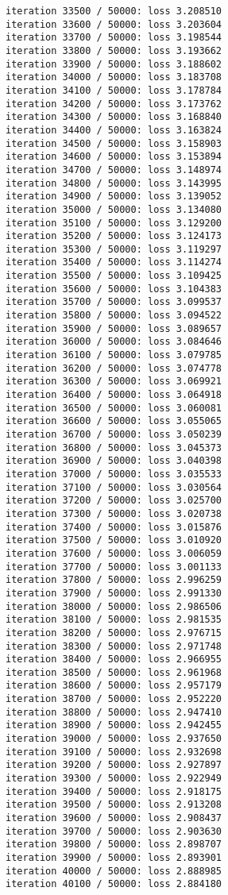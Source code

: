 \documentclass[11pt]{article}
\begin{document}
\begin{Verbatim}[commandchars=\\\{\}]
iteration 33500 / 50000: loss 3.208510
iteration 33600 / 50000: loss 3.203604
iteration 33700 / 50000: loss 3.198544
iteration 33800 / 50000: loss 3.193662
iteration 33900 / 50000: loss 3.188602
iteration 34000 / 50000: loss 3.183708
iteration 34100 / 50000: loss 3.178784
iteration 34200 / 50000: loss 3.173762
iteration 34300 / 50000: loss 3.168840
iteration 34400 / 50000: loss 3.163824
iteration 34500 / 50000: loss 3.158903
iteration 34600 / 50000: loss 3.153894
iteration 34700 / 50000: loss 3.148974
iteration 34800 / 50000: loss 3.143995
iteration 34900 / 50000: loss 3.139052
iteration 35000 / 50000: loss 3.134080
iteration 35100 / 50000: loss 3.129200
iteration 35200 / 50000: loss 3.124173
iteration 35300 / 50000: loss 3.119297
iteration 35400 / 50000: loss 3.114274
iteration 35500 / 50000: loss 3.109425
iteration 35600 / 50000: loss 3.104383
iteration 35700 / 50000: loss 3.099537
iteration 35800 / 50000: loss 3.094522
iteration 35900 / 50000: loss 3.089657
iteration 36000 / 50000: loss 3.084646
iteration 36100 / 50000: loss 3.079785
iteration 36200 / 50000: loss 3.074778
iteration 36300 / 50000: loss 3.069921
iteration 36400 / 50000: loss 3.064918
iteration 36500 / 50000: loss 3.060081
iteration 36600 / 50000: loss 3.055065
iteration 36700 / 50000: loss 3.050239
iteration 36800 / 50000: loss 3.045373
iteration 36900 / 50000: loss 3.040398
iteration 37000 / 50000: loss 3.035533
iteration 37100 / 50000: loss 3.030564
iteration 37200 / 50000: loss 3.025700
iteration 37300 / 50000: loss 3.020738
iteration 37400 / 50000: loss 3.015876
iteration 37500 / 50000: loss 3.010920
iteration 37600 / 50000: loss 3.006059
iteration 37700 / 50000: loss 3.001133
iteration 37800 / 50000: loss 2.996259
iteration 37900 / 50000: loss 2.991330
iteration 38000 / 50000: loss 2.986506
iteration 38100 / 50000: loss 2.981535
iteration 38200 / 50000: loss 2.976715
iteration 38300 / 50000: loss 2.971748
iteration 38400 / 50000: loss 2.966955
iteration 38500 / 50000: loss 2.961968
iteration 38600 / 50000: loss 2.957179
iteration 38700 / 50000: loss 2.952220
iteration 38800 / 50000: loss 2.947410
iteration 38900 / 50000: loss 2.942455
iteration 39000 / 50000: loss 2.937650
iteration 39100 / 50000: loss 2.932698
iteration 39200 / 50000: loss 2.927897
iteration 39300 / 50000: loss 2.922949
iteration 39400 / 50000: loss 2.918175
iteration 39500 / 50000: loss 2.913208
iteration 39600 / 50000: loss 2.908437
iteration 39700 / 50000: loss 2.903630
iteration 39800 / 50000: loss 2.898707
iteration 39900 / 50000: loss 2.893901
iteration 40000 / 50000: loss 2.888985
iteration 40100 / 50000: loss 2.884180

\end{Verbatim}
\end{document}
